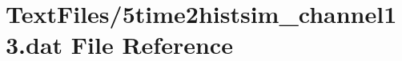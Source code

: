 \hypertarget{5time2histsim__channel13_8dat}{}\section{Text\+Files/5time2histsim\+\_\+channel13.dat File Reference}
\label{5time2histsim__channel13_8dat}
